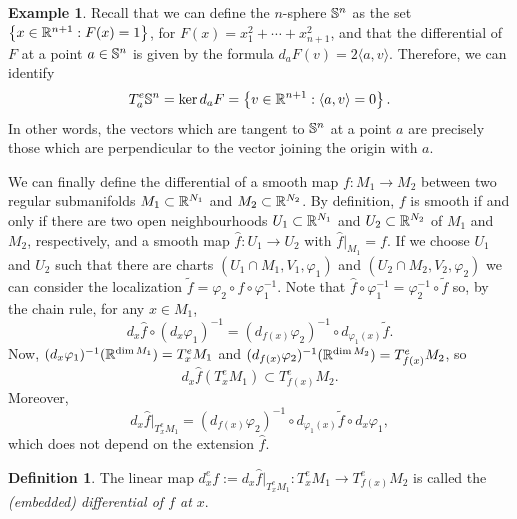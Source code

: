 \documentclass[11pt,a4paper]{book}
\theoremstyle{remark} \newtheorem{rmk}[thm]{Remark}
\theoremstyle{definition} \newtheorem{defn}[thm]{Definition}
\theoremstyle{definition} \newtheorem{ex}[thm]{Example}
\theoremstyle{definition} \newtheorem{ej}[thm]{Exercise}
\begin{document}
\begin{ex}
  Recall that we can define the $n$-sphere $\mathbb S^n$ as the set $\left\{ x\in \mathbb R^{n+1}: F(x)=1 \right\}$, for $F(x)=x_1^2 + \cdots + x_{n+1}^2$, and that the differential of $F$ at a point $a\in \mathbb S^n$ is given by the formula $d_a F(v) = 2 \langle a, v \rangle$. Therefore, we can identify
  \begin{equation*}
T^e_a \mathbb S^n = \ker d_a F = \left\{ v \in \mathbb R^{n+1}: \langle a, v\rangle =0 \right\}.
  \end{equation*}
In other words, the vectors which are tangent to $\mathbb S^n$ at a point $a$ are precisely those which are perpendicular to the vector joining the origin with $a$.
\end{ex}

We can finally define the differential of a smooth map $f:M_1\rightarrow M_2$ between two regular submanifolds $M_1\subset \mathbb R^{N_1}$ and $M_2\subset \mathbb R^{N_2}$. By definition, $f$ is smooth if and only if there are two open neighbourhoods $U_1\subset \mathbb R^{N_1}$ and $U_2\subset \mathbb R^{N_2}$ of $M_1$ and $M_2$, respectively, and a smooth map $\hat{f}:U_1\rightarrow U_2$ with $\hat{f}|_{M_1}=f$. If we choose $U_1$ and $U_2$ such that there are charts $(U_1\cap M_1,V_1,\varphi_1)$ and $(U_2\cap M_2,V_2,\varphi_2)$ we can consider the localization $\tilde{f}=\varphi_2 \circ f \circ \varphi_1^{-1}$. Note that $\hat{f}\circ \varphi_1^{-1}=\varphi_2^{-1}\circ \tilde{f}$ so, by the chain rule, for any $x\in M_1$,
\begin{equation*}
d_x \hat{f} \circ (d_{x}\varphi_1)^{-1} = (d_{f(x)}\varphi_2)^{-1} \circ d_{\varphi_1(x)} \tilde{f}.
\end{equation*}
Now, $(d_x\varphi_1)^{-1}(\mathbb R^{\dim M_1}) = T^e_x M_1$ and $(d_{f(x)}\varphi_2)^{-1}(\mathbb R^{\dim M_2})=T^e_{f(x)}M_2$, so
\begin{equation*}
d_x \hat{f}(T^e_x M_1) \subset T^e_{f(x)}M_2.
\end{equation*}
Moreover,
\begin{equation*}
d_x \hat{f}|_{T^e_x M_1} = (d_{f(x)}\varphi_2)^{-1} \circ d_{\varphi_1(x)} \tilde{f} \circ d_{x}\varphi_1,
\end{equation*}
which does not depend on the extension $\hat{f}$.

\begin{defn}
The linear map $d_x^e f:=d_x \hat{f}|_{T^e_x M_1}: T^e_x M_1 \rightarrow T^e_{f(x)}M_2$ is called the \emph{(embedded) differential of $f$ at $x$}.
\end{defn}
\end{document}
